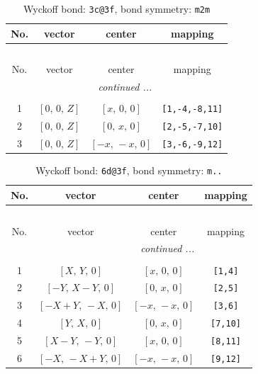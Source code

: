 \documentclass[fleqn,8pt]{jsarticle}
\begin{document}
\renewcommand{\arraystretch}{1.2}
\begin{longtable}{cccc}
\caption{Wyckoff bond: {\tt 3c@3f}, bond symmetry: {\tt m2m}}
 \\
 \hline \hline
No. & vector & center & mapping \\ \hline \endfirsthead

\multicolumn{3}{l}{\tablename\ \thetable{}} \\
 \hline \hline
No. & vector & center & mapping \\ \hline \endhead

 \hline \hline
\multicolumn{3}{r}{\footnotesize\it continued ...} \\ \endfoot

 \hline \hline
\multicolumn{3}{r}{} \\ \endlastfoot

1 & $\left[ 0,\, 0,\, Z \right]$ & $\left[ x,\, 0,\, 0 \right]$ & {\tt [1,-4,-8,11]} \\ \hline
2 & $\left[ 0,\, 0,\, Z \right]$ & $\left[ 0,\, x,\, 0 \right]$ & {\tt [2,-5,-7,10]} \\ \hline
3 & $\left[ 0,\, 0,\, Z \right]$ & $\left[ - x,\, - x,\, 0 \right]$ & {\tt [3,-6,-9,12]} \\
\end{longtable}
\renewcommand{\arraystretch}{1.2}
\begin{longtable}{cccc}
\caption{Wyckoff bond: {\tt 6d@3f}, bond symmetry: {\tt m..}}
 \\
 \hline \hline
No. & vector & center & mapping \\ \hline \endfirsthead

\multicolumn{3}{l}{\tablename\ \thetable{}} \\
 \hline \hline
No. & vector & center & mapping \\ \hline \endhead

 \hline \hline
\multicolumn{3}{r}{\footnotesize\it continued ...} \\ \endfoot

 \hline \hline
\multicolumn{3}{r}{} \\ \endlastfoot

1 & $\left[ X,\, Y,\, 0 \right]$ & $\left[ x,\, 0,\, 0 \right]$ & {\tt [1,4]} \\ \hline
2 & $\left[ - Y,\, X - Y,\, 0 \right]$ & $\left[ 0,\, x,\, 0 \right]$ & {\tt [2,5]} \\ \hline
3 & $\left[ - X + Y,\, - X,\, 0 \right]$ & $\left[ - x,\, - x,\, 0 \right]$ & {\tt [3,6]} \\ \hline
4 & $\left[ Y,\, X,\, 0 \right]$ & $\left[ 0,\, x,\, 0 \right]$ & {\tt [7,10]} \\ \hline
5 & $\left[ X - Y,\, - Y,\, 0 \right]$ & $\left[ x,\, 0,\, 0 \right]$ & {\tt [8,11]} \\ \hline
6 & $\left[ - X,\, - X + Y,\, 0 \right]$ & $\left[ - x,\, - x,\, 0 \right]$ & {\tt [9,12]} \\
\end{longtable}
\end{document}
